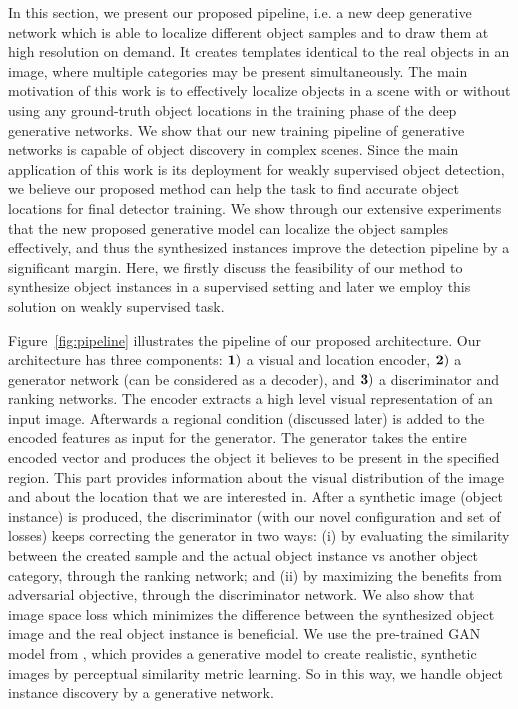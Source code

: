 \documentclass[runningheads]{llncs}
\begin{document}
In this section, we present our proposed pipeline, i.e. a new deep generative network which is able to localize different object samples and to draw them at high resolution on demand. It creates templates identical to the real objects in an image, where multiple categories may be present simultaneously. The main motivation of this work is to effectively localize objects in a scene with or without using any ground-truth object locations in the training phase of the deep generative networks. We show that our new training pipeline of generative networks is capable of object discovery in complex scenes. Since the main application of this work is its deployment for  weakly supervised object detection, we believe our proposed method can help the task to find accurate object locations for final detector training. We show through our extensive experiments that the new proposed generative model can localize the object samples effectively, and thus the synthesized instances improve the detection pipeline by a significant margin. Here, we firstly discuss the feasibility of our method to synthesize object instances in a supervised setting and later we employ this solution on weakly supervised task.


Figure~\ref{fig:pipeline} illustrates the pipeline of our proposed architecture. Our architecture has three components: $\bf{1)}$ a visual and location encoder, $\bf{2)}$ a generator network (can be considered as a decoder), and $\bf{3)}$ a discriminator and ranking networks. The encoder extracts a high level visual representation of an input image. Afterwards a regional condition (discussed later) is added to the encoded features as input for the generator. The generator takes the entire encoded vector and produces the object it believes to be present in the specified region. This part provides information about the visual distribution of the image and about the location that we are interested in. After a synthetic image (object instance) is produced, the discriminator (with our novel configuration and set of losses) keeps correcting the generator in two ways: (i) by evaluating the similarity between the created sample and the actual object instance vs another object category, through the ranking network; and (ii) by maximizing the benefits from adversarial objective, through the discriminator network. We also show that image space loss which minimizes the difference between the synthesized object image and the real object instance is beneficial. We use the pre-trained GAN model from \cite{dosovitskiy2}, which provides a generative model to create realistic, synthetic images by perceptual similarity metric learning. So in this way, we handle object instance discovery by a generative network.
\end{document}
